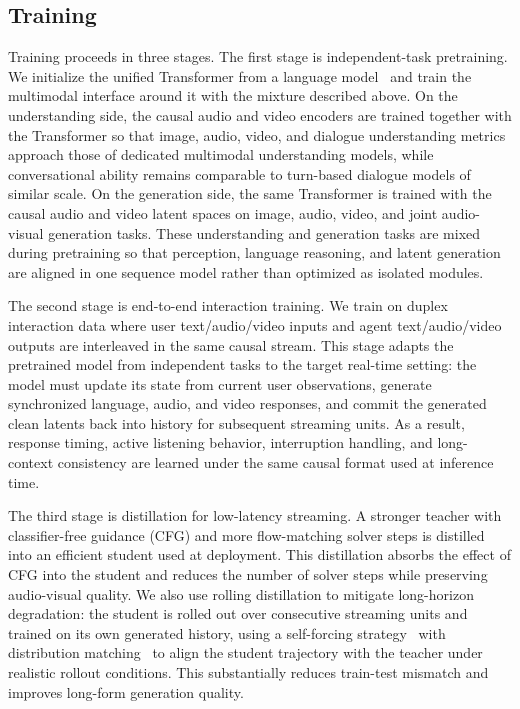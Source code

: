 \documentclass[]{style/style}
\begin{document}
\subsection{Training}
Training proceeds in three stages. The first stage is independent-task pretraining. We initialize the unified Transformer from a language model~\citep{yang2025qwen25,yang2025qwen3} and train the multimodal interface around it with the mixture described above. On the understanding side, the causal audio and video encoders are trained together with the Transformer so that image, audio, video, and dialogue understanding metrics approach those of dedicated multimodal understanding models, while conversational ability remains comparable to turn-based dialogue models of similar scale. On the generation side, the same Transformer is trained with the causal audio and video latent spaces on image, audio, video, and joint audio-visual generation tasks. These understanding and generation tasks are mixed during pretraining so that perception, language reasoning, and latent generation are aligned in one sequence model rather than optimized as isolated modules.

The second stage is end-to-end interaction training. We train on duplex interaction data where user text/audio/video inputs and agent text/audio/video outputs are interleaved in the same causal stream. This stage adapts the pretrained model from independent tasks to the target real-time setting: the model must update its state from current user observations, generate synchronized language, audio, and video responses, and commit the generated clean latents back into history for subsequent streaming units. As a result, response timing, active listening behavior, interruption handling, and long-context consistency are learned under the same causal format used at inference time.

The third stage is distillation for low-latency streaming. A stronger teacher with classifier-free guidance (CFG) and more flow-matching solver steps is distilled into an efficient student used at deployment. This distillation absorbs the effect of CFG into the student and reduces the number of solver steps while preserving audio-visual quality. We also use rolling distillation to mitigate long-horizon degradation: the student is rolled out over consecutive streaming units and trained on its own generated history, using a self-forcing strategy~\citep{huang2025selfforcing} with distribution matching~\citep{yin2024onestepdiffusiondistributionmatching,yin2024improveddistributionmatchingdistillation} to align the student trajectory with the teacher under realistic rollout conditions. This substantially reduces train-test mismatch and improves long-form generation quality.
\end{document}
